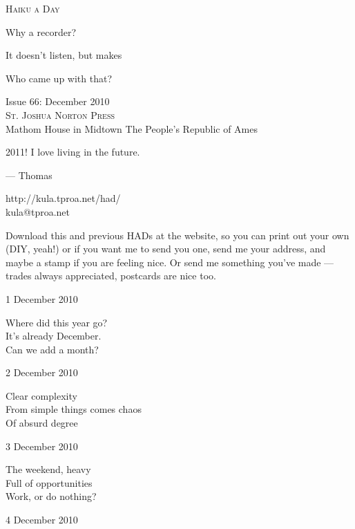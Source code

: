 \documentclass[12pt]{article}
\begin{document}
\begin{center}
{\fontsize{36}{48}\selectfont \textsc{Haiku a Day }}
\end{center}

\vspace*{3.5cm}

{\fontsize{20}{40}\selectfont 

Why a recorder?

It doesn't listen, but makes

Who came up with that?

}

\vspace*{5.0cm}
\begin{center}
{\large{Issue 66: December 2010}} \\[5mm]
{\fontsize{8}{8}\selectfont  \textsc{ St. Joshua Norton Press }} \\[1mm]
{\fontsize{6}{6}\selectfont Mathom House in Midtown \textbar The People's Republic of Ames }
\end{center}


\newpage

2011! I love living in the future.

--- Thomas

http://kula.tproa.net/had/ \\
kula@tproa.net

Download this and previous HADs at the website, so you can
print out your own (DIY, yeah!) or if you want me to send
you one, send me your address, and maybe a stamp if you
are feeling nice. Or send me something you've made ---
trades always appreciated, postcards are nice too.

\vfill

1 December 2010

Where did this year go? \\
It's already December. \\
Can we add a month?

2 December 2010

Clear complexity \\
From simple things comes chaos \\
Of absurd degree

3 December 2010

The weekend, heavy \\
Full of opportunities \\
Work, or do nothing?


\newpage

4 December 2010
\end{document}
